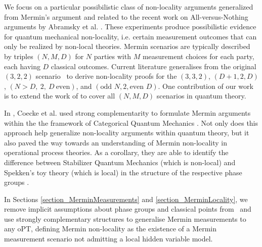        We focus on a particular possibilistic class of non-locality arguments generalized from Mermin's argument \cite{mermin1990quantum} and related to the recent work on All-versus-Nothing arguments by Abramsky et al. \cite{NLC-AvN}. These experiments produce possibilistic evidence for quantum mechanical non-locality, i.e. certain measurement outcomes that can only be realized by non-local theories.  Mermin scenarios are typically described by triples $(N,M,D)$ for $N$ parties with $M$ measurement choices for each party, each having $D$ classical outcomes. Current literature generalises from the original $(3,2,2)$ scenario~\cite{mermin1990quantum} to derive non-locality proofs for the $(3,3,2)$\cite{ryu2014multisetting}, $(D+1,2,D)$\cite{zukowski-GHZ-multiport}, $(N>D,~2,~D~\mbox{even})$\cite{cerf-GHZ-many}, and $(\mbox{odd }N, 2, \mbox{even }D)$\cite{lee-even-dim}. One contribution of our work is to extend the work of \cite{coecke2012strong} to cover all $(N,M,D)$ scenarios in quantum theory.

In \cite{coecke2012strong}, Coecke et al. used strong complementarity to formulate Mermin arguments within the the framework of Categorical Quantum Mechanics \cite{abramsky2008categorical}. Not only does this approach help generalize non-locality arguments within quantum theory, but it also paved the way towards an understanding of Mermin non-locality in operational process theories. As a corollary, they are able to identify the difference between Stabilizer Quantum Mechanics (which is non-local) and Spekken's toy theory (which is local) in the structure of the respective phase groups \cite{coecke2012strong,coecke2011phase}.

In Sections \ref{section_MerminMeasurements} and \ref{section_MerminLocality}, we remove implicit assumptions about phase groups and classical points from~\cite{coecke2012strong} and use strongly complementary structures to generalise Mermin measurements to any oPT, defining Mermin non-locality as the existence of a Mermin measurement scenario not admitting a local hidden variable model.


